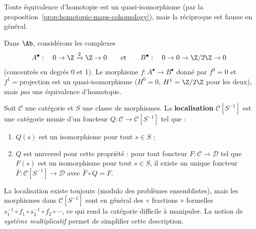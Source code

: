 \begin{remarque}\label{rem:htpy-eq-is-qiso}
Toute équivalence d'homotopie est un quasi-isomorphisme (par la
proposition~\ref{prop:homotopic-maps-cohomology}), mais la réciproque
est fausse en général.
\end{remarque}

\begin{exemple}\label{ex:quasi-iso-not-htpy}
Dans $\Ab$, considérons les complexes
\[
  A^\bullet : \quad 0 \to \Z \xrightarrow{2} \Z \to 0
  \qquad \text{et} \qquad
  B^\bullet : \quad 0 \to 0 \to \Z/2\Z \to 0
\]
(concentrés en degrés 0 et 1). Le morphisme $f \colon A^\bullet \to B^\bullet$
donné par $f^0 = 0$ et $f^1 = \text{projection}$ est un quasi-isomorphisme
($H^0 = 0$, $H^1 = \Z/2\Z$ pour les deux), mais \emph{pas} une
équivalence d'homotopie.
\end{exemple}

\begin{definition}\label{def:localization}
Soit $\mathcal{C}$ une catégorie et $S$ une classe de morphismes.
La \textbf{localisation} $\mathcal{C}[S^{-1}]$ est une catégorie munie
d'un foncteur $Q \colon \mathcal{C} \to \mathcal{C}[S^{-1}]$ tel que :
\begin{enumerate}[label=(\roman*)]
\item $Q(s)$ est un isomorphisme pour tout $s \in S$ ;
\item $Q$ est universel pour cette propriété : pour tout foncteur
  $F \colon \mathcal{C} \to \mathcal{D}$ tel que $F(s)$ est un
  isomorphisme pour tout $s \in S$, il existe un unique foncteur
  $\bar{F} \colon \mathcal{C}[S^{-1}] \to \mathcal{D}$ avec
  $\bar{F} \circ Q = F$.
\end{enumerate}
\end{definition}

\begin{remarque}\label{rem:localization-existence}
La localisation existe toujours (modulo des problèmes ensemblistes),
mais les morphismes dans $\mathcal{C}[S^{-1}]$ sont en général
des « fractions » formelles
$s_1^{-1} \circ f_1 \circ s_2^{-1} \circ f_2 \circ \cdots$,
ce qui rend la catégorie difficile à manipuler. La notion de
\emph{système multiplicatif} permet de
simplifier cette description.
\end{remarque}

